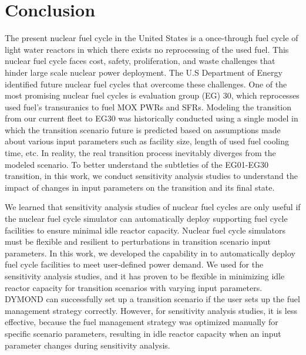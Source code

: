 \chapter{Conclusion}
The present nuclear fuel cycle in the United States is a once-through 
fuel cycle of light water reactors in which there exists no reprocessing 
of the used fuel. 
This nuclear fuel cycle faces cost, safety, proliferation, and waste 
challenges that hinder large scale nuclear power deployment. 
The U.S Department of Energy identified future 
nuclear fuel cycles that overcome these challenges.  
One of the most promising nuclear fuel cycles is evaluation group (EG) 30, 
which reprocesses used fuel's transuranics to fuel \gls{MOX} \glspl{PWR}
and \glspl{SFR}. 
Modeling the transition from our current fleet to EG30 was historically 
conducted using a single model in which the transition scenario future 
is predicted based on assumptions made about various input parameters 
such as facility size, length of used fuel cooling time, etc. 
In reality, the real transition process inevitably diverges from the 
modeled scenario. 
To better understand the subtleties of the EG01-EG30 transition,
in this work, we conduct sensitivity analysis studies to 
understand the impact of changes in input parameters on the transition 
and its final state. 

We learned that sensitivity analysis studies of nuclear fuel cycles 
are only useful if the nuclear fuel cycle simulator can 
automatically deploy supporting fuel cycle facilities 
to ensure minimal idle reactor capacity. 
Nuclear fuel cycle simulators must be flexible and resilient to 
perturbations in transition scenario input parameters. 
In this work, we developed the \deploy capability in \Cyclus to 
automatically deploy fuel cycle facilities to meet user-defined 
power demand. 
We used \deploy for the sensitivity analysis studies, and it has 
proven to be flexible in minimizing idle reactor capacity for 
transition scenarios with varying input parameters. 
DYMOND can successfully set up a transition scenario if the 
user sets up the fuel management strategy correctly. 
However, for sensitivity analysis studies, it is less effective, 
because the fuel management strategy was optimized manually for specific 
scenario parameters, resulting in idle reactor capacity when 
an input parameter changes during sensitivity analysis.

